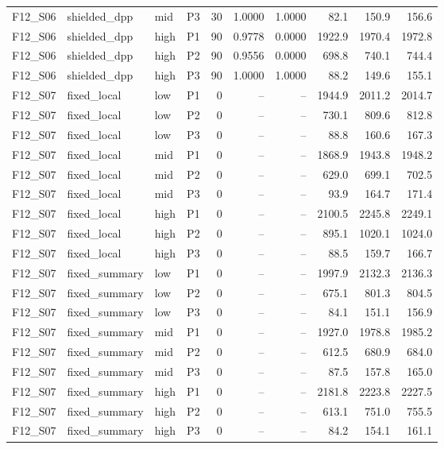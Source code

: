 \begin{longtable}{llllrrrrrr}
F12\_S06 & shielded\_dpp & mid & P3 & 30 & 1.0000 & 1.0000 & 82.1 & 150.9 & 156.6 \\
F12\_S06 & shielded\_dpp & high & P1 & 90 & 0.9778 & 0.0000 & 1922.9 & 1970.4 & 1972.8 \\
F12\_S06 & shielded\_dpp & high & P2 & 90 & 0.9556 & 0.0000 & 698.8 & 740.1 & 744.4 \\
F12\_S06 & shielded\_dpp & high & P3 & 90 & 1.0000 & 1.0000 & 88.2 & 149.6 & 155.1 \\
F12\_S07 & fixed\_local & low & P1 & 0 & -- & -- & 1944.9 & 2011.2 & 2014.7 \\
F12\_S07 & fixed\_local & low & P2 & 0 & -- & -- & 730.1 & 809.6 & 812.8 \\
F12\_S07 & fixed\_local & low & P3 & 0 & -- & -- & 88.8 & 160.6 & 167.3 \\
F12\_S07 & fixed\_local & mid & P1 & 0 & -- & -- & 1868.9 & 1943.8 & 1948.2 \\
F12\_S07 & fixed\_local & mid & P2 & 0 & -- & -- & 629.0 & 699.1 & 702.5 \\
F12\_S07 & fixed\_local & mid & P3 & 0 & -- & -- & 93.9 & 164.7 & 171.4 \\
F12\_S07 & fixed\_local & high & P1 & 0 & -- & -- & 2100.5 & 2245.8 & 2249.1 \\
F12\_S07 & fixed\_local & high & P2 & 0 & -- & -- & 895.1 & 1020.1 & 1024.0 \\
F12\_S07 & fixed\_local & high & P3 & 0 & -- & -- & 88.5 & 159.7 & 166.7 \\
F12\_S07 & fixed\_summary & low & P1 & 0 & -- & -- & 1997.9 & 2132.3 & 2136.3 \\
F12\_S07 & fixed\_summary & low & P2 & 0 & -- & -- & 675.1 & 801.3 & 804.5 \\
F12\_S07 & fixed\_summary & low & P3 & 0 & -- & -- & 84.1 & 151.1 & 156.9 \\
F12\_S07 & fixed\_summary & mid & P1 & 0 & -- & -- & 1927.0 & 1978.8 & 1985.2 \\
F12\_S07 & fixed\_summary & mid & P2 & 0 & -- & -- & 612.5 & 680.9 & 684.0 \\
F12\_S07 & fixed\_summary & mid & P3 & 0 & -- & -- & 87.5 & 157.8 & 165.0 \\
F12\_S07 & fixed\_summary & high & P1 & 0 & -- & -- & 2181.8 & 2223.8 & 2227.5 \\
F12\_S07 & fixed\_summary & high & P2 & 0 & -- & -- & 613.1 & 751.0 & 755.5 \\
F12\_S07 & fixed\_summary & high & P3 & 0 & -- & -- & 84.2 & 154.1 & 161.1 \\

\end{longtable}
